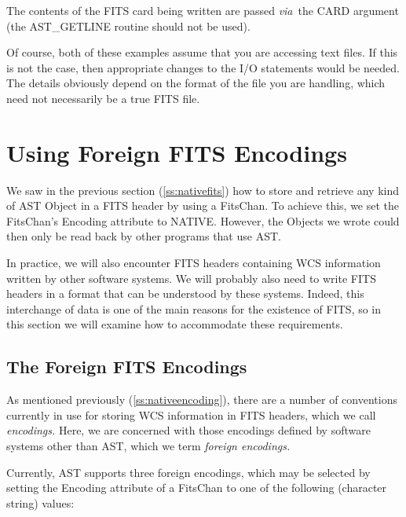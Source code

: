 \documentclass[twoside,11pt]{article}
\newcommand{\htmlref}[2]{#1}
\newcommand{\secref}[1]{\S\ref{#1}}
\renewcommand{\secref}[1]{\ref{#1}}
\begin{document}
The contents of the FITS card being written are passed {\em{via}}\ the
CARD argument (the \htmlref{AST\_GETLINE}{AST_GETLINE} routine should not be used).

Of course, both of these examples assume that you are accessing text
files. If this is not the case, then appropriate changes to the I/O
statements would be needed.  The details obviously depend on the
format of the file you are handling, which need not necessarily be a
true FITS file.

\cleardoublepage
\section{\label{ss:foreignfits}Using Foreign FITS Encodings}

We saw in the previous section (\secref{ss:nativefits}) how to store
and retrieve any kind of AST \htmlref{Object}{Object} in a FITS header by using a
\htmlref{FitsChan}{FitsChan}. To achieve this, we set the FitsChan's \htmlref{Encoding}{Encoding} attribute to
NATIVE. However, the Objects we wrote could then only be read back by
other programs that use AST.

In practice, we will also encounter FITS headers containing WCS
information written by other software systems.  We will probably also
need to write FITS headers in a format that can be understood by these
systems. Indeed, this interchange of data is one of the main reasons
for the existence of FITS, so in this section we will examine how to
accommodate these requirements.

\subsection{\label{ss:foreignencodings}The Foreign FITS Encodings}

As mentioned previously (\secref{ss:nativeencoding}), there are a
number of conventions currently in use for storing WCS information in
FITS headers, which we call {\em{encodings.}} Here, we are concerned
with those encodings defined by software systems other than AST, which
we term {\em{foreign encodings.}}

Currently, AST supports three foreign encodings, which may be selected
by setting the \htmlref{Encoding}{Encoding} attribute of a \htmlref{FitsChan}{FitsChan} to one of the
following (character string) values:
\end{document}
